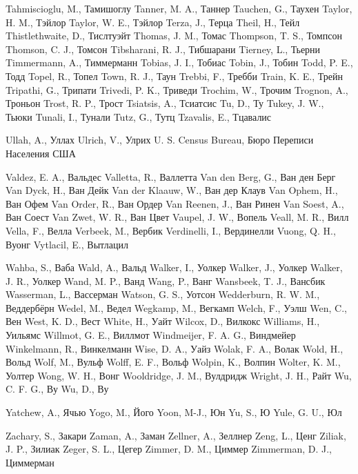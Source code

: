 Tahmiscioglu, M., Тамишоглу
Tanner, M. A., Таннер
Tauchen, G., Таухен
Taylor, H. M., Тэйлор
Taylor, W. E., Тэйлор
Terza, J., Терца
Theil, H., Тейл
Thistlethwaite, D., Тислтуэйт
Thomas, J. M., Томас
Thompson, T. S., Томпсон
Thomson, C. J., Томсон
Tibsharani, R. J., Тибшарани
Tierney, L., Тьерни
Timmermann, A., Тиммерманн 
Tobias, J. I., Тобиас
Tobin, J., Тобин
Todd, P. E., Тодд 
Topel, R., Топел
Town, R. J., Таун
Trebbi, F., Требби
Train, K. E., Трейн
Tripathi, G., Трипати
Trivedi, P. K., Триведи
Trochim, W., Трочим
Trognon, A., Троньон 
Trost, R. P., Трост
Tsiatsis, A., Тсиатсис
Tu, D., Ту
Tukey, J. W., Тьюки
Tunali, I., Тунали
Tutz, G., Тутц
Tzavalis, E., Тцавалис

Ullah, A., Уллах
Ulrich, V., Улрих
U. S. Census Bureau, Бюро Переписи Населения США 

Valdez, E. A., Вальдес
Valletta, R., Валлетта
Van den Berg, G., Ван ден Берг
Van Dyck, H., Ван Дейк
Van der Klaauw, W., Ван дер Клаув
Van Ophem, H., Ван Офем
Van Order, R., Ван Ордер
Van Reenen, J., Ван Ринен
Van Soest, A., Ван Соест
Van Zwet, W. R., Ван Цвет
Vaupel, J. W., Вопель
Veall, M. R., Вилл
Vella, F., Велла
Verbeek, M., Вербик 
Verdinelli, I., Вердинелли
Vuong, Q. H., Вуонг 
Vytlacil, E., Вытлацил

Wahba, S., Ваба
Wald, A., Вальд
Walker, I., Уолкер
Walker, J., Уолкер
Walker, J. R., Уолкер
Wand, M. P., Ванд
Wang, P., Ванг
Wansbeek, T. J., Вансбик 
Wasserman, L., Вассерман
Watson, G. S., Уотсон
Wedderburn, R. W. M., Веддербёрн
Wedel, M., Ведел
Wegkamp, M., Вегкамп
Welch, F., Уэлш
Wen, C., Вен
West, K. D., Вест
White, H., Уайт
Wilcox, D., Вилкокс
Williams, H., Уильямс
Willmot, G. E., Виллмот
Windmeijer, F. A. G., Виндмейер
Winkelmann, R., Винкелманн
Wise, D. A., Уайз
Wolak, F. A., Волак
Wold, H., Вольд
Wolf, M., Вульф
Wolff, E. F., Вольф
Wolpin, K., Волпин
Wolter, K. M., Уолтер
Wong, W. H., Вонг
Wooldridge, J. M., Вулдридж
Wright, J. H., Райт
Wu, C. F. G., Ву
Wu, D., Ву

Yatchew, A., Ячью
Yogo, M., Його
Yoon, M-J., Юн
Yu, S., Ю
Yule, G. U., Юл

Zachary, S., Закари
Zaman, A., Заман
Zellner, A., Зеллнер
Zeng, L., Ценг
Ziliak, J. P., Зилиак
Zeger, S. L., Цегер
Zimmer, D. M., Циммер
Zimmerman, D. J., Циммерман
 